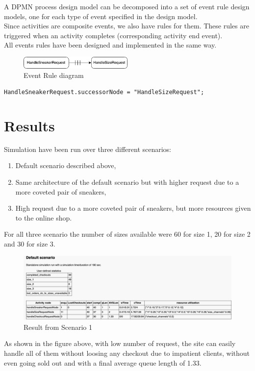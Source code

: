\documentclass{article}
\begin{document}
\FloatBarrier

A DPMN process design model can be decomposed into a set of event rule design models, one for each type of event specified in the design model. \\
Since activities are composite events, we also have rules for them. These rules are triggered when an activity completes (corresponding activity end event).\\
All events rules have been designed and implemented in the same way.

\begin{figure}[h]
    \centering
    \includegraphics[width=0.5\textwidth]{Event_Rule}
    \caption{Event Rule diagram}
 \end{figure}

\FloatBarrier

\medskip
\begin{lstlisting}[caption=Event Rule]
HandleSneakerRequest.successorNode = "HandleSizeRequest";
\end{lstlisting}



\section{Results}

Simulation have been run over three different scenarios:
\begin{enumerate}
\item Default scenario described above,
\item Same architecture of the default scenario but with higher request due to a more coveted pair of sneakers,
\item High request due to a more coveted pair of sneakers, but more resources given to the online shop.
\end{enumerate}
For all three scenario the number of sizes available were 60 for size 1, 20 for size 2 and 30 for size 3.
\begin{figure}[h]
    \centering
    \includegraphics[width=1.0\textwidth]{Scenario1_Results}
    \caption{Result from Scenario 1}
 \end{figure}
 \FloatBarrier
 As shown in the figure above, with low number of request, the site can easily handle all of them without loosing any checkout due to impatient clients, without even going sold out and with a final average queue length of 1.33.
 
\end{document}
